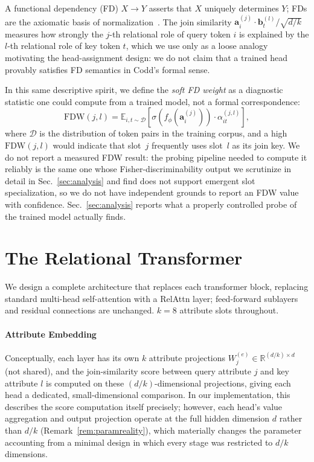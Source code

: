 \documentclass[review]{elsarticle}
\newcommand{\R}{\mathbb{R}}
\begin{document}
A functional dependency (FD) $X \to Y$ asserts that $X$ uniquely determines $Y$; FDs are the axiomatic basis of normalization~\cite{codd1970relational}. The join similarity $\mathbf{a}^{(j)}_i \cdot \mathbf{b}^{(l)}_t / \sqrt{d/k}$ measures how strongly the $j$-th relational role of query token $i$ is explained by the $l$-th relational role of key token $t$, which we use only as a loose analogy motivating the head-assignment design: we do not claim that a trained head provably satisfies FD semantics in Codd's formal sense.

In this same descriptive spirit, we define the \emph{soft FD weight} as a diagnostic statistic one could compute from a trained model, not a formal correspondence:
\begin{equation}
\mathrm{FDW}(j, l) = \mathbb{E}_{i,t \sim \mathcal{D}}\!\left[\sigma(f_\phi(\mathbf{a}^{(j)}_i)) \cdot \alpha_{it}^{(j,l)}\right],
\end{equation}
where $\mathcal{D}$ is the distribution of token pairs in the training corpus, and a high $\mathrm{FDW}(j,l)$ would indicate that slot~$j$ frequently uses slot~$l$ as its join key. We do not report a measured FDW result: the probing pipeline needed to compute it reliably is the same one whose Fisher-discriminability output we scrutinize in detail in Sec.~\ref{sec:analysis} and find does not support emergent slot specialization, so we do not have independent grounds to report an FDW value with confidence. Sec.~\ref{sec:analysis} reports what a properly controlled probe of the trained model actually finds.

\section{The Relational Transformer}
\label{sec:architecture}

We design a complete architecture that replaces each transformer block, replacing standard multi-head self-attention with a RelAttn layer; feed-forward sublayers and residual connections are unchanged. $k=8$ attribute slots throughout.

\paragraph{Attribute Embedding}
Conceptually, each layer has its own $k$ attribute projections $W_j^{(e)} \in \R^{(d/k) \times d}$ (not shared), and the join-similarity score between query attribute $j$ and key attribute $l$ is computed on these $(d/k)$-dimensional projections, giving each head a dedicated, small-dimensional comparison. In our implementation, this describes the score computation itself precisely; however, each head's value aggregation and output projection operate at the full hidden dimension $d$ rather than $d/k$ (Remark~\ref{rem:paramreality}), which materially changes the parameter accounting from a minimal design in which every stage was restricted to $d/k$ dimensions.
\end{document}
